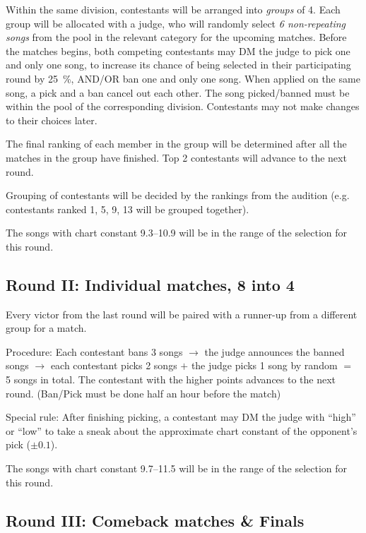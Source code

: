 \documentclass{article}
\newcommand{\alert}[1]{{\color{red} #1}}
\newcommand{\srbgcolor}{red!40}
\newcommand{\specialrule}[1]{\colorbox{\srbgcolor}{\parbox{\textwidth}{#1}}}
\begin{document}
Within the same division,
contestants will be arranged into \emph{groups} of 4.
Each group will be allocated with a judge,
who will randomly select \emph{6 non-repeating songs}
from the pool in the relevant category
for the upcoming matches.
Before the matches begins,
both competing contestants
may DM the judge to pick one and only one song,
to increase its chance of being selected
in their participating round by \qty{25}{\percent},
AND/OR ban one and only one song.
When applied on the same song,
a pick and a ban cancel out each other.
The song picked/banned must be within
the pool of the corresponding division.
Contestants may not make changes to their choices later.

The final ranking of each member in the group will be determined
after all the matches in the group have finished.
Top 2 contestants will advance to the next round.

Grouping of contestants will be decided
by the rankings from the audition
(e.g. contestants ranked 1, 5, 9, 13
will be grouped together).

\alert{
	The songs with chart constant 9.3--10.9
	will be in the range of the selection for this round.
}

\subsection  {Round II: Individual matches, 8 into 4}

Every victor  %
from the last round
will be paired with a runner-up
from a different group for a match.

Procedure: Each contestant bans 3 songs $\rightarrow$
the judge announces the banned songs $\rightarrow$
each contestant picks 2 songs $+$ the judge picks 1 song by random $=$ 5 songs in total.
The contestant with the higher points advances to the next round.
(Ban/Pick must be done half an hour before the match)

\specialrule{
	Special rule: After finishing picking,
	a contestant may DM the judge with ``high'' or ``low''
	to take a sneak about
	the approximate chart constant of the opponent's pick
	($\pm0.1$).
}

\nopagebreak

\alert{
	The songs with chart constant 9.7--11.5
	will be in the range of the selection for this round.
}

\subsection{Round III: Comeback %
	matches \& Finals}
\end{document}
